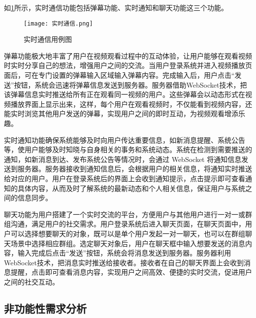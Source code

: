 如\ref{实时通信用例图}所示，实时通信功能包括弹幕功能、实时通知和聊天功能这三个功能。
\begin{figure}[hbt]
    \centering
    \texttt{[image: 实时通信.png]}
    \caption{实时通信用例图}
    \label{实时通信用例图}
\end{figure}

弹幕功能极大地丰富了用户在视频观看过程中的互动体验，让用户能够在观看视频时实时分享自己的想法，增强用户之间的交流。当用户登录系统并进入视频播放页面后，可在专门设置的弹幕输入区域输入弹幕内容。完成输入后，用户点击“发送”按钮，系统会迅速将弹幕信息发送到服务器。服务器借助WebSocket技术，把该弹幕信息实时推送给所有正在观看同一视频的用户。这些弹幕会以动态形式在视频播放界面上显示出来，这样，每个用户在观看视频时，不仅能看到视频内容，还能实时浏览其他用户发送的弹幕，实现用户之间的即时互动，为视频观看增添乐趣。

实时通知功能确保系统能够及时向用户传达重要信息，如新消息提醒、系统公告等，使用户能够及时知晓与自身相关的事务和系统动态。系统在检测到需要推送的通知，如新消息到达、发布系统公告等情况时，会通过 WebSocket 将通知信息发送到服务器。服务器接收到通知信息后，会根据用户的相关信息，将通知实时推送给对应的用户。用户在登录系统后的界面上会收到通知提示，点击提示即可查看通知的具体内容，从而及时了解系统的最新动态和个人相关信息，保证用户与系统之间的信息同步。

聊天功能为用户搭建了一个实时交流的平台，方便用户与其他用户进行一对一或群组沟通，满足用户的社交需求。用户登录系统后进入聊天页面，在聊天页面中，用户可以选择想要聊天的对象，既可以是单个用户发起一对一聊天，也可以在群组聊天场景中选择相应群组。选定聊天对象后，用户在聊天框中输入想要发送的消息内容，输入完成后点击“发送”按钮，系统会将消息发送到服务器。服务器利用WebSocket技术，把消息实时推送给接收者。接收者在自己的聊天界面上会收到消息提醒，点击即可查看消息内容，实现用户之间高效、便捷的实时交流，促进用户之间的社交互动。

\subsection{非功能性需求分析}

